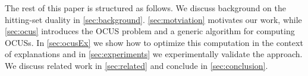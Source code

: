 %
%
%
%


The rest of this paper is structured as follows.
We discuss background on the hitting-set duality in \cref{sec:background}. \cref{sec:motviation} motivates our work, while \cref{sec:ocus} introduces the OCUS problem and a generic \hitsetbased algorithm for computing OCUSs. In \cref{sec:ocusEx} we show how to optimize this computation in the context of explanations and in  
\cref{sec:experiments}  we experimentally validate the approach. %
We discuss related work in  \cref{sec:related} and conclude in \cref{sec:conclusion}.


